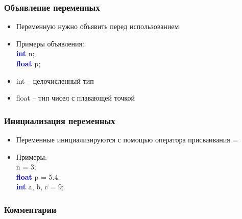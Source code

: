 \documentclass[14pt,pdf,hyperref={unicode}]{beamer}
\begin{document}
\begin{frame}
\frametitle{Объявление переменных} 
\begin{center}
\begin{itemize}
\item Переменную нужно объявить перед использованием
\item Примеры объявления:\\
\textcolor{blue}{\textbf{int}} n;\\
\textcolor{blue}{\textbf{float}} p;
\item int -- целочисленный тип \\
\item float -- тип чисел с плавающей точкой
\end{itemize}
\end{center}
\end{frame}

\begin{frame}
\frametitle{Инициализация переменных} 
\begin{center}
\begin{itemize}
\item Переменные инициализируются с помощью оператора присваивания =
\item Примеры:\\
n = 3; \\
\textcolor{blue}{\textbf{float}} p = 5.4; \\
\textcolor{blue}{\textbf{int}} a, b, c = 9;
\end{itemize}
\end{center}
\end{frame}

\begin{frame}
\frametitle{Комментарии}



\end{frame}
\end{document}
